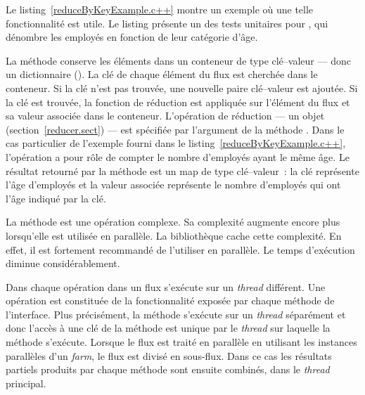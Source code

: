 Le listing~\ref{reduceByKeyExample.c++} montre un exemple o\`u une telle fonctionnalit\'e est utile. Le listing pr\'esente un des tests unitaires pour , qui d\'enombre les employ\'es en fonction de leur cat\'egorie d'\^age. 

La m\'ethode  conserve les \'el\'ements dans un conteneur de type cl\'e--valeur --- donc un dictionnaire (). La cl\'e de chaque \'el\'ement du flux est cherch\'ee dans le conteneur. Si la cl\'e n'est pas trouv\'ee, une nouvelle paire cl\'e--valeur est ajout\'ee. Si la cl\'e est trouv\'ee, la fonction de r\'eduction est appliqu\'ee sur l'\'el\'ement du flux et sa valeur associ\'ee dans le conteneur. L'op\'eration de r\'eduction --- un objet  (section~\ref{reducer.sect})  --- est sp\'ecifi\'ee par l'argument de la m\'ethode . Dans le cas particulier de l'exemple fourni dans le listing~\ref{reduceByKeyExample.c++}, l'op\'eration a pour r\^ole de compter le nombre d'employ\'es ayant le m\^eme \^age. Le r\'esultat retourn\'e par la m\'ethode  est un map de type cl\'e--valeur~: la cl\'e repr\'esente l'\^age d'employ\'es et la valeur associ\'ee repr\'esente le nombre d'employ\'es qui ont l'\^age indiqu\'e par la cl\'e.



La m\'ethode  est une op\'eration complexe. Sa complexit\'e augmente encore plus lorsqu'elle est utilis\'ee en parall\`ele. La biblioth\`eque  cache cette complexit\'e. En effet, il est fortement recommand\'e de l'utiliser en parall\`ele. Le temps d'ex\'ecution diminue consid\'erablement.

Dans  chaque op\'eration dans un flux s'ex\'ecute sur un \emph{thread} diff\'erent. Une op\'eration est constitu\'ee de la fonctionnalit\'e expos\'ee par chaque m\'ethode de l'interface. Plus pr\'ecisément, la m\'ethode  s'ex\'ecute sur un \emph{thread} s\'epar\'ement et donc l'acc\`es \`a une cl\'e de la m\'ethode est unique par le \emph{thread} sur laquelle la m\'ethode s'ex\'ecute. Lorsque le flux est trait\'e en parall\`ele en utilisant les instances parall\`eles d'un \emph{farm}, le flux est divis\'e en sous-flux. Dans ce cas les r\'esultats partiels produits par chaque m\'ethode  sont ensuite combin\'es, dans le \emph{thread} principal.



